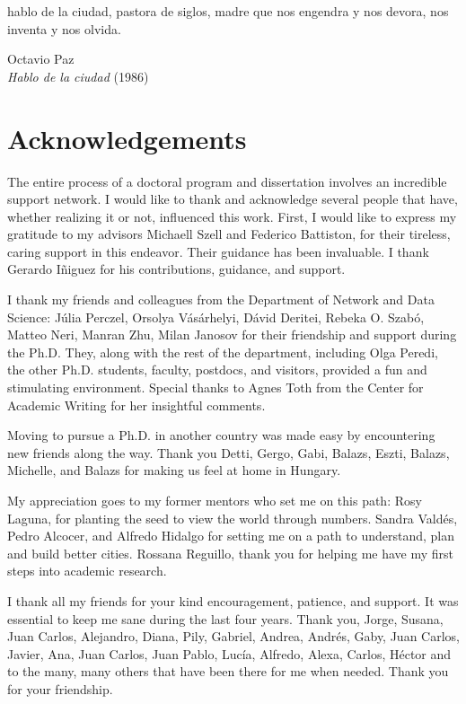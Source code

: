 \documentclass[a4paper,twoside,12pt]{book}
\begin{document}
\newpage
\frontmatter
\epigraph{hablo de la ciudad, pastora de siglos, madre que nos engendra y nos devora, nos inventa y nos olvida.}{Octavio Paz\\ \textit{Hablo de la ciudad} (1986)}
\vfill
\thispagestyle{empty}

\chapter*{Acknowledgements}
The entire process of a doctoral program and dissertation involves an incredible support network. I would like to thank and acknowledge several people that have, whether realizing it or not, influenced this work. First, I would like to express my gratitude to my advisors Michaell Szell and Federico Battiston, for their tireless, caring support in this endeavor. Their guidance has been invaluable. I thank Gerardo I\~niguez for his contributions, guidance, and support.

I thank my friends and colleagues from the Department of Network and Data Science: J\'ulia Perczel, Orsolya V\'as\'arhelyi, D\'avid Deritei, Rebeka O. Szab\'o, Matteo Neri, Manran Zhu, Milan Janosov for their friendship and support during the Ph.D. They, along with the rest of the department, including Olga Peredi, the other Ph.D. students, faculty, postdocs, and visitors, provided a fun and stimulating environment. Special thanks to Agnes Toth from the Center for Academic Writing for her insightful comments.

Moving to pursue a Ph.D. in another country was made easy by encountering new friends along the way. Thank you Detti, Gergo, Gabi, Balazs, Eszti, Balazs, Michelle, and Balazs for making us feel at home in Hungary. 

My appreciation goes to my former mentors who set me on this path: Rosy Laguna, for planting the seed to view the world through numbers. Sandra Vald\'es, Pedro Alcocer, and Alfredo Hidalgo for setting me on a path to understand, plan and build better cities. Rossana Reguillo, thank you for helping me have my first steps into academic research.

I thank all my friends for your kind encouragement, patience, and support. It was essential to keep me sane during the last four years. Thank you, Jorge, Susana, Juan Carlos, Alejandro, Diana, Pily, Gabriel, Andrea, Andr\'es, Gaby, Juan Carlos, Javier, Ana, Juan Carlos, Juan Pablo, Luc\'ia, Alfredo, Alexa, Carlos, H\'ector and to the many, many others that have been there for me when needed. Thank you for your friendship.
\end{document}
